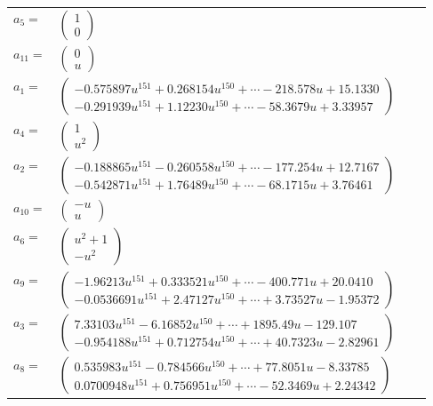 \documentclass[1p]{elsarticle_modified}
\theoremstyle{definition}
\begin{document}
\begin{tabular}{m{7pt} m{180pt} m{7pt} m{180pt} }
\flushright $a_{5}=$&$\begin{pmatrix}1\\0\end{pmatrix}$ \\
\flushright $a_{11}=$&$\begin{pmatrix}0\\u\end{pmatrix}$ \\
\flushright $a_{1}=$&$\begin{pmatrix}-0.575897 u^{151}+0.268154 u^{150}+\cdots-218.578 u+15.1330\\-0.291939 u^{151}+1.12230 u^{150}+\cdots-58.3679 u+3.33957\end{pmatrix}$ \\
\flushright $a_{4}=$&$\begin{pmatrix}1\\u^2\end{pmatrix}$ \\
\flushright $a_{2}=$&$\begin{pmatrix}-0.188865 u^{151}-0.260558 u^{150}+\cdots-177.254 u+12.7167\\-0.542871 u^{151}+1.76489 u^{150}+\cdots-68.1715 u+3.76461\end{pmatrix}$ \\
\flushright $a_{10}=$&$\begin{pmatrix}- u\\u\end{pmatrix}$ \\
\flushright $a_{6}=$&$\begin{pmatrix}u^2+1\\- u^2\end{pmatrix}$ \\
\flushright $a_{9}=$&$\begin{pmatrix}-1.96213 u^{151}+0.333521 u^{150}+\cdots-400.771 u+20.0410\\-0.0536691 u^{151}+2.47127 u^{150}+\cdots+3.73527 u-1.95372\end{pmatrix}$ \\
\flushright $a_{3}=$&$\begin{pmatrix}7.33103 u^{151}-6.16852 u^{150}+\cdots+1895.49 u-129.107\\-0.954188 u^{151}+0.712754 u^{150}+\cdots+40.7323 u-2.82961\end{pmatrix}$ \\
\flushright $a_{8}=$&$\begin{pmatrix}0.535983 u^{151}-0.784566 u^{150}+\cdots+77.8051 u-8.33785\\0.0700948 u^{151}+0.756951 u^{150}+\cdots-52.3469 u+2.24342\end{pmatrix}$ \\

\end{tabular}
\end{document}

